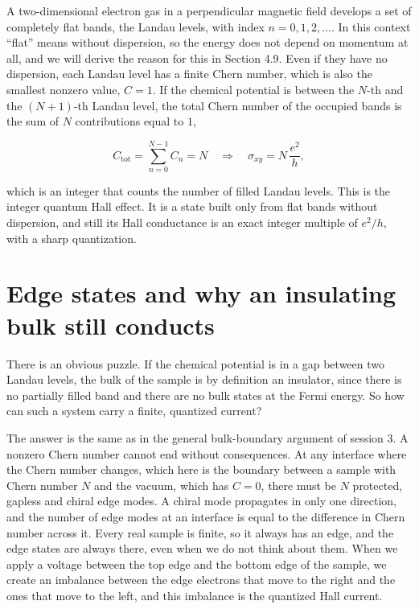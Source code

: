 A two-dimensional electron gas in a perpendicular magnetic field develops a set of completely flat
bands, the Landau levels, with index $n=0,1,2,\dots$. In this context ``flat'' means without
dispersion, so the energy does not depend on momentum at all, and we will derive the reason for
this in Section 4.9. Even if they have no dispersion, each Landau level has a finite Chern number,
which is also the smallest nonzero value, $C=1$. If the chemical potential is between the $N$-th
and the $(N+1)$-th Landau level, the total Chern number of the occupied bands is the sum of $N$
contributions equal to $1$,

\begin{equation}
C_{\text{tot}} = \sum_{n=0}^{N-1} C_n = N \quad\Longrightarrow\quad \sigma_{xy} = N\,\frac{e^2}{h},
\end{equation}

which is an integer that counts the number of filled Landau levels. This is the integer quantum
Hall effect. It is a state built only from flat bands without dispersion, and still its Hall
conductance is an exact integer multiple of $e^2/h$, with a sharp quantization.

\section{Edge states and why an insulating bulk still conducts}

There is an obvious puzzle. If the chemical potential is in a gap between two Landau levels, the
bulk of the sample is by definition an insulator, since there is no partially filled band and
there are no bulk states at the Fermi energy. So how can such a system carry a finite, quantized
current?

The answer is the same as in the general bulk-boundary argument of session 3. A nonzero Chern
number cannot end without consequences. At any interface where the Chern number changes, which here
is the boundary between a sample with Chern number $N$ and the vacuum, which has $C=0$, there must
be $N$ protected, gapless and chiral edge modes. A chiral mode propagates in only one direction,
and the number of edge modes at an interface is equal to the difference in Chern number across it.
Every real sample is finite, so it always has an edge, and the edge states are always there, even
when we do not think about them. When we apply a voltage between the top edge and the bottom edge
of the sample, we create an imbalance between the edge electrons that move to the right and the
ones that move to the left, and this imbalance is the quantized Hall current.

